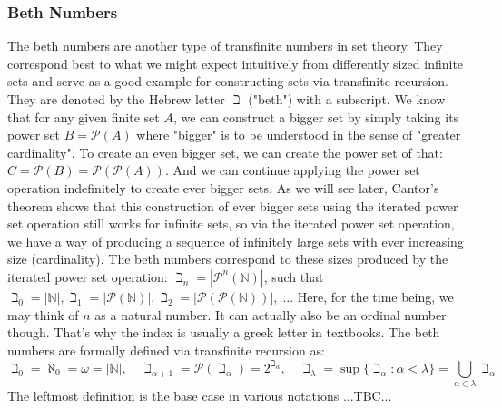 \subsubsection{Beth Numbers}
The beth numbers are another type of transfinite numbers in set theory. They correspond best to what we might expect intuitively from differently sized infinite sets and serve as a good example for constructing sets via transfinite recursion. They are denoted by the Hebrew letter $\beth$ ("beth") with a subscript. We know that for any given finite set $A$, we can construct a bigger set by simply taking its power set $B = \mathcal{P}(A)$ where "bigger" is to be understood in the sense of "greater cardinality". To create an even bigger set, we can create the power set of that: $C = \mathcal{P}(B) = \mathcal{P}(\mathcal{P}(A))$. And we can continue applying the power set operation indefinitely to create ever bigger sets. As we will see later, Cantor's theorem shows that this construction of ever bigger sets using the iterated power set operation still works for infinite sets, so via the iterated power set operation, we have a way of producing a sequence of infinitely large sets with ever increasing size (cardinality). The beth numbers correspond to these sizes produced by the iterated power set operation: $\beth_n = |\mathcal{P}^n (\mathbb{N})|$, such that $\beth_0 = |\mathbb{N}|, \beth_1 = |\mathcal{P} (\mathbb{N})|, \beth_2 = |\mathcal{P}(\mathcal{P} (\mathbb{N}))|, \ldots$. Here, for the time being, we may think of $n$ as a natural number. It can actually also be an ordinal number though. That's why the index is usually a greek letter in textbooks. The beth numbers are formally defined via transfinite recursion as:
\begin{equation}
\beth_0 = \aleph_0 
        = \omega 
        = |\mathbb{N}|, \quad
\beth_{\alpha + 1} = \mathcal{P}(\beth_{\alpha}) 
                   = 2^{\beth_{\alpha}}, \quad
\beth_{\lambda} = \sup \{ \beth_{\alpha} : \alpha < \lambda \} 
                = \bigcup_{\alpha \in \lambda} \beth_{\alpha} 
\end{equation}
The leftmost definition is the base case in various notations
...TBC...



